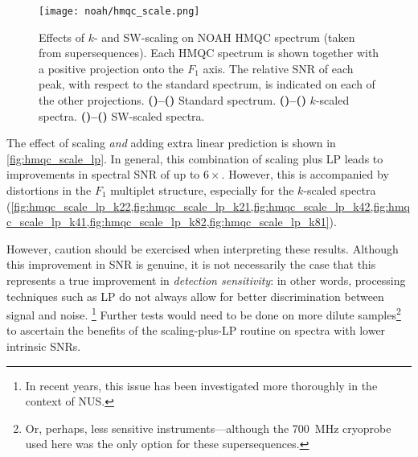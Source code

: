\begin{figure}[!htbp]
    \centering
    \texttt{[image: noah/hmqc\_scale.png]}%
    {\label{fig:hmqc_scale_std2}}%
    {\label{fig:hmqc_scale_std1}}%
    {\label{fig:hmqc_scale_k22}}%
    {\label{fig:hmqc_scale_k21}}%
    {\label{fig:hmqc_scale_k42}}%
    {\label{fig:hmqc_scale_k41}}%
    {\label{fig:hmqc_scale_k82}}%
    {\label{fig:hmqc_scale_k81}}%
    {\label{fig:hmqc_scale_sw22}}%
    {\label{fig:hmqc_scale_sw21}}%
    {\label{fig:hmqc_scale_sw42}}%
    {\label{fig:hmqc_scale_sw41}}%
    {\label{fig:hmqc_scale_sw82}}%
    {\label{fig:hmqc_scale_sw81}}%
    \caption[Effects of $k$- and SW-scaling on NOAH HMQC spectrum]{
        Effects of $k$- and SW-scaling on NOAH HMQC spectrum (taken from  supersequences).
        Each HMQC spectrum is shown together with a positive projection onto the $F_1$ axis.
        The relative SNR of each peak, with respect to the standard spectrum, is indicated on each of the other projections.
        \textbf{()--()} Standard spectrum.
        \textbf{()--()} $k$-scaled spectra.
        \textbf{()--()} SW-scaled spectra.
    }
    \label{fig:hmqc_scale}
\end{figure}

The effect of scaling \textit{and} adding extra linear prediction is shown in \cref{fig:hmqc_scale_lp}.
In general, this combination of scaling plus LP leads to improvements in spectral SNR of up to $6\times$.
However, this is accompanied by distortions in the $F_1$ multiplet structure, especially for the $k$-scaled spectra (\cref{fig:hmqc_scale_lp_k22,fig:hmqc_scale_lp_k21,fig:hmqc_scale_lp_k42,fig:hmqc_scale_lp_k41,fig:hmqc_scale_lp_k82,fig:hmqc_scale_lp_k81}).

However, caution should be exercised when interpreting these results.
Although this improvement in SNR is genuine, it is not necessarily the case that this represents a true improvement in \textit{detection sensitivity}: in other words, processing techniques such as LP do not always allow for better discrimination between signal and noise.\autocite{Donoho1990PNASUSA,Stern2002JACS}%
\footnote{In recent years, this issue has been investigated more thoroughly in the context of NUS.\autocite{Palmer2015JPCB}}
Further tests would need to be done on more dilute samples\footnote{Or, perhaps, less sensitive instruments---although the \qty{700}{\MHz} cryoprobe used here was the only option for these supersequences.} to ascertain the benefits of the scaling-plus-LP routine on spectra with lower intrinsic SNRs.


